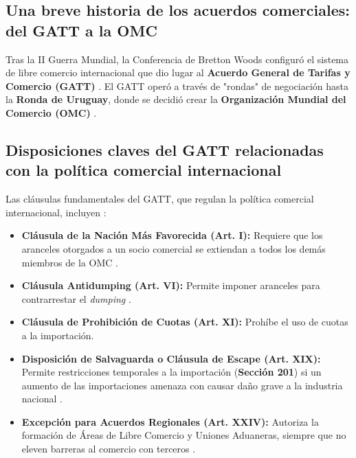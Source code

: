 \subsection{Una breve historia de los acuerdos comerciales: del GATT a la OMC}
Tras la II Guerra Mundial, la Conferencia de Bretton Woods configuró el sistema de libre comercio internacional que dio lugar al \textbf{Acuerdo General de Tarifas y Comercio (GATT)} . El GATT operó a través de "rondas" de negociación hasta la \textbf{Ronda de Uruguay}, donde se decidió crear la \textbf{Organización Mundial del Comercio (OMC)} .

\subsection{Disposiciones claves del GATT relacionadas con la política comercial internacional}
Las cláusulas fundamentales del GATT, que regulan la política comercial internacional, incluyen :
\begin{itemize}
    \item \textbf{Cláusula de la Nación Más Favorecida (Art. I):} Requiere que los aranceles otorgados a un socio comercial se extiendan a todos los demás miembros de la OMC .
    \item \textbf{Cláusula Antidumping (Art. VI):} Permite imponer aranceles para contrarrestar el \textit{dumping} .
    \item \textbf{Cláusula de Prohibición de Cuotas (Art. XI):} Prohíbe el uso de cuotas a la importación.
    \item \textbf{Disposición de Salvaguarda o Cláusula de Escape (Art. XIX):} Permite restricciones temporales a la importación (\textbf{Sección 201}) si un aumento de las importaciones amenaza con causar daño grave a la industria nacional .
    \item \textbf{Excepción para Acuerdos Regionales (Art. XXIV):} Autoriza la formación de Áreas de Libre Comercio y Uniones Aduaneras, siempre que no eleven barreras al comercio con terceros .
\end{itemize}

